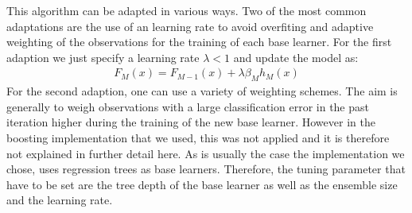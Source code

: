 This algorithm can be adapted in various ways. Two of the most common adaptations are the use of an learning rate to avoid overfiting and adaptive weighting of the observations for the training of each base learner. For the first adaption we just specify a learning rate $\lambda < 1$ and update the model as: 
\begin{align}
F_M(x) = F_{M-1}(x) + \lambda \beta_M h_M(x)
\end{align}
For the second adaption, one can use a variety of weighting schemes. The aim is generally to weigh observations with a large classification error in the past iteration higher during the training of the new base learner. However in the boosting implementation that we used, this was not applied and it is therefore not explained in further detail here.
As is usually the case the implementation we chose, uses regression trees as base learners. Therefore, the tuning parameter that have to be set are the tree depth of the base learner as well as the ensemble size and the learning rate.